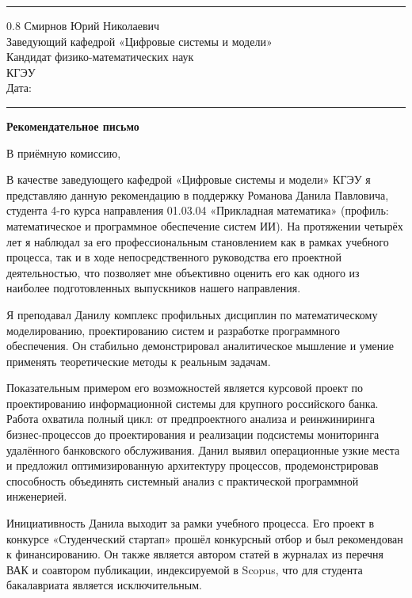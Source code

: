 \documentclass[a4paper,12pt]{article}
\begin{document}
\vspace{4pt}
\noindent\rule{\textwidth}{0.8pt}

\begin{flushright}
  \begin{spacing}{0.8}
    Смирнов Юрий Николаевич\\
    Заведующий кафедрой «Цифровые системы и модели»\\
    Кандидат физико-математических наук\\
    КГЭУ\\[6pt]
    Дата: \rule{4cm}{0.4pt}
  \end{spacing}
\end{flushright}

\begin{center}
  {\Large\bfseries Рекомендательное письмо}
\end{center}

В приёмную комиссию,

В качестве заведующего кафедрой «Цифровые системы и модели» КГЭУ я представляю данную рекомендацию в поддержку Романова Данила Павловича, студента 4-го курса направления 01.03.04 «Прикладная математика» (профиль: ма\-те\-ма\-ти\-че\-ское и про\-грамм\-ное обес\-пе\-че\-ние систем ИИ). На протяжении четырёх лет я наблюдал за его профессиональным становлением как в рамках учебного процесса, так и в ходе непосредственного руководства его проектной деятельностью, что позволяет мне объективно оценить его как одного из наиболее подготовленных выпускников нашего направления.

Я преподавал Данилу комплекс профильных дисциплин по математическому моделированию, проектированию систем и разработке программного обеспечения. Он стабильно демонстрировал аналитическое мышление и умение применять теоретические методы к реальным задачам.

Показательным примером его возможностей является курсовой проект по проектированию информационной системы для крупного российского банка. Работа охватила полный цикл: от предпроектного анализа и реинжиниринга бизнес-процессов до проектирования и реализации подсистемы мониторинга удалённого банковского обслуживания. Данил выявил операционные узкие места и предложил оптимизированную архитектуру процессов, продемонстрировав способность объединять системный анализ с практической программной инженерией.

Инициативность Данила выходит за рамки учебного процесса. Его проект в конкурсе «Студенческий стартап» прошёл конкурсный отбор и был рекомендован к финансированию. Он также является автором статей в журналах из перечня ВАК и соавтором публикации, индексируемой в Scopus, что для студента бакалавриата является исключительным.
\end{document}
